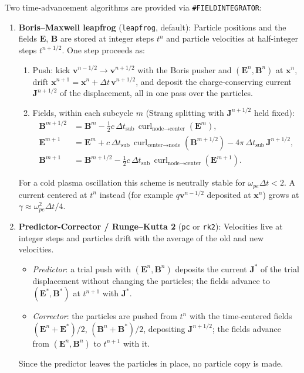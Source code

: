 \documentclass[a4paper, 11pt]{article}
\begin{document}
Two time-advancement algorithms are provided via \texttt{\#FIELDINTEGRATOR}:
\begin{enumerate}
  \item \textbf{Boris--Maxwell leapfrog} (\texttt{leapfrog}, default):
  Particle positions and the fields $\mathbf{E}$, $\mathbf{B}$ are stored at integer steps $t^n$ and particle velocities at half-integer steps $t^{n+1/2}$. One step proceeds as:
  \begin{enumerate}
    \item Push: kick $\mathbf{v}^{n-1/2} \to \mathbf{v}^{n+1/2}$ with the Boris pusher and $(\mathbf{E}^n, \mathbf{B}^n)$ at $\mathbf{x}^n$, drift $\mathbf{x}^{n+1} = \mathbf{x}^n + \Delta t\,\mathbf{v}^{n+1/2}$, and deposit the charge-conserving current $\mathbf{J}^{n+1/2}$ of the displacement, all in one pass over the particles.
    \item Fields, within each subcycle $m$ (Strang splitting with $\mathbf{J}^{n+1/2}$ held fixed):
    \begin{align}
    \mathbf{B}^{m+1/2} &= \mathbf{B}^{m} - \tfrac{1}{2} c\,\Delta t_{\text{sub}}\,\operatorname{curl}_{\text{node}\to\text{center}}(\mathbf{E}^m), \\
    \mathbf{E}^{m+1} &= \mathbf{E}^m + c\,\Delta t_{\text{sub}}\,\operatorname{curl}_{\text{center}\to\text{node}}(\mathbf{B}^{m+1/2}) - 4\pi\,\Delta t_{\text{sub}}\,\mathbf{J}^{n+1/2}, \\
    \mathbf{B}^{m+1} &= \mathbf{B}^{m+1/2} - \tfrac{1}{2} c\,\Delta t_{\text{sub}}\,\operatorname{curl}_{\text{node}\to\text{center}}(\mathbf{E}^{m+1}).
    \end{align}
  \end{enumerate}
  For a cold plasma oscillation this scheme is neutrally stable for $\omega_{pe}\Delta t < 2$. A current centered at $t^n$ instead (for example $q\mathbf{v}^{n-1/2}$ deposited at $\mathbf{x}^n$) grows at $\gamma \approx \omega_{pe}^2 \Delta t / 4$.

  \item \textbf{Predictor-Corrector / Runge--Kutta 2} (\texttt{pc} or \texttt{rk2}):
  Velocities live at integer steps and particles drift with the average of the old and new velocities.
  \begin{itemize}
    \item \emph{Predictor}: a trial push with $(\mathbf{E}^n, \mathbf{B}^n)$ deposits the current $\mathbf{J}^*$ of the trial displacement without changing the particles; the fields advance to $(\mathbf{E}^*, \mathbf{B}^*)$ at $t^{n+1}$ with $\mathbf{J}^*$.
    \item \emph{Corrector}: the particles are pushed from $t^n$ with the time-centered fields $(\mathbf{E}^n + \mathbf{E}^*)/2$, $(\mathbf{B}^n + \mathbf{B}^*)/2$, depositing $\mathbf{J}^{n+1/2}$; the fields advance from $(\mathbf{E}^n, \mathbf{B}^n)$ to $t^{n+1}$ with it.
  \end{itemize}
  Since the predictor leaves the particles in place, no particle copy is made.
\end{enumerate}
\end{document}
